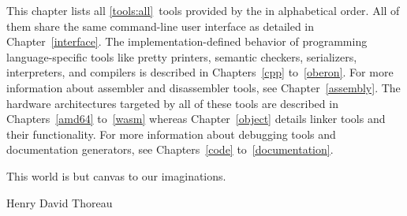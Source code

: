 




\renewcommand{\flowgraph}[1]{}
\rohead{\topmark{ -- }\botmark}
\newcommand{\seeprefix}{}\renewcommand{\seedocumentationref}[3]{\seeprefix{}\documentationref{#2}{#3}\renewcommand{\seeprefix}{/}}
\renewcommand{\toolsection}[1]{\normalfont\par\medskip\noindent\textbf{#1}\refstepcounter{tool}\phantomsection\addcontentsline{toc}{section}{#1}\markboth{}{\ifodd\thepage#1\else\botmark\fi}\index[tools]{#1 tool@\tool{#1} tool}\renewcommand{\seeprefix}{\em\alignright\mbox{See Chapter }}}


This chapter lists all \ref*{tools:all}~tools provided by the \ecs{} in alphabetical order.
All of them share the same command-line user interface as detailed in Chapter~\ref{interface}.
The implementation-defined behavior of programming language-specific tools like pretty printers, semantic checkers, serializers, interpreters, and compilers is described in Chapters~\ref{cpp} to~\ref{oberon}.
For more information about assembler and disassembler tools, see Chapter~\ref{assembly}.
The hardware architectures targeted by all of these tools are described in Chapters~\ref{amd64} to~\ref{wasm} whereas Chapter~\ref{object} details linker tools and their functionality.
For more information about debugging tools and documentation generators, see Chapters~\ref{code} to~\ref{documentation}.

\epigraph{This world is but canvas to our imaginations.}{Henry David Thoreau}

